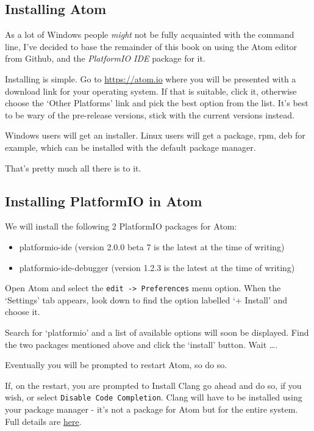 \subsection{Installing Atom}\label{installing-atom}

As a lot of Windows people \emph{might} not be fully acquainted with the command
line, I've decided to base the remainder of this book on using the Atom editor
from Github, and the \emph{PlatformIO IDE} package for it. 

Installing is simple. Go to \href{https://atom.io}{https://atom.io} where you will be presented with a download link for your operating system. If that is suitable, click it, otherwise choose the `Other Platforms' link and pick the best option from the list. It's best to be wary of the pre-release versions, stick with the current versions instead.

Windows users will get an installer. Linux users will get a package, rpm, deb for example, which can be installed with the default package manager.

That's pretty much all there is to it.

\subsection{Installing PlatformIO in
Atom}\label{installing-platformio-in-atom}

We will install the following 2 PlatformIO packages for Atom:

\begin{itemize}
\item
  platformio-ide (version 2.0.0 beta 7 is the latest at the time of
  writing)
\item
  platformio-ide-debugger (version 1.2.3 is the latest at the time of
  writing)
\end{itemize}

Open Atom and select the \lstinline!edit -> Preferences! menu option.
When the `Settings' tab appears, look down to find the option labelled
`+ Install' and choose it.

Search for `platformio' and a list of available options will soon be
displayed. Find the two packages mentioned above and click the `install'
button. Wait \ldots{}.

Eventually you will be prompted to restart Atom, so do so.

If, on the restart, you are prompted to Install Clang go ahead and do
so, if you wish, or select \lstinline!Disable Code Completion!. Clang
will have to be installed using your package manager - it's not a
package for Atom but for the entire system. Full details are
\href{http://docs.platformio.org/en/latest/ide/atom.html\#ii-clang-for-intelligent-code-completion}{here}.

